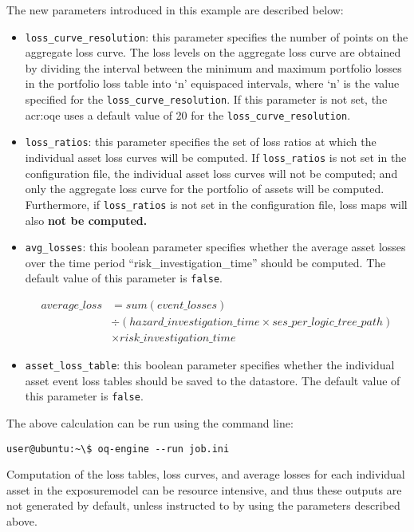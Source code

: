 The new parameters introduced in this example are described below:

\begin{itemize}

  \item \Verb+loss_curve_resolution+: this parameter specifies the number of
    points on the aggregate loss curve. The loss levels on the aggregate loss
    curve are obtained by dividing the interval between the minimum and maximum
    portfolio losses in the portfolio loss table into `n' equispaced intervals,
    where `n' is the value specified for the \Verb+loss_curve_resolution+.
    If this parameter is not set, the \glsdesc{acr:oqe} uses a default value of
    20 for the \Verb+loss_curve_resolution+.

  \item \Verb+loss_ratios+: this parameter specifies the set of loss ratios at
    which the individual asset loss curves will be computed. If
    \Verb+loss_ratios+ is not set in the configuration file, the individual 
    asset loss curves will not be computed; and only the aggregate loss curve
    for the portfolio of assets will be computed. Furthermore, if
    \Verb+loss_ratios+ is not set in the configuration file, loss maps will
    also \bf{not} be computed.

  \item \Verb+avg_losses+: this boolean parameter specifies whether the average
    asset losses over the time period ``risk\_investigation\_time'' should be
    computed. The default value of this parameter is \Verb+false+.

    \begin{equation*}
    \begin{split}
    average\_loss & = sum(event\_losses) \\
                 & \div (hazard\_investigation\_time \times ses\_per\_logic\_tree\_path) \\
                 & \times risk\_investigation\_time
    \end{split}
    \end{equation*}

  \item \Verb+asset_loss_table+: this boolean parameter specifies whether the
    individual asset event loss tables should be saved to the datastore. 
    The default value of this parameter is \Verb+false+.

\end{itemize}

The above calculation can be run using the command line:

\begin{verbatim}
user@ubuntu:~\$ oq-engine --run job.ini
\end{verbatim}

Computation of the loss tables, loss curves, and average losses for each
individual \gls{asset} in the \gls{exposuremodel} can be resource intensive,
and thus these outputs are not generated by default, unless instructed to by
using the parameters described above.
